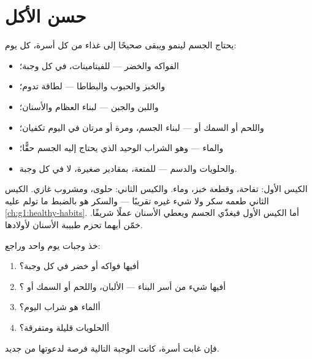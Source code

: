 \section{حسن الأكل}

\begin{proposition}\label{prop:g2:teeth-and-eating-well:balanced}
يحتاج الجسم لينمو ويبقى صحيحًا إلى غذاء من كل أسرة، كل يوم:
\begin{itemize}
  \item الفواكه والخضر --- للفيتامينات، في كل وجبة؛
  \item والخبز والحبوب والبطاطا --- لطاقة تدوم؛
  \item {} واللبن والجبن --- لبناء العظام والأسنان؛
  \item واللحم أو السمك أو  --- لبناء الجسم، ومرة أو مرتان في
        اليوم تكفيان؛
  \item والماء --- وهو الشراب الوحيد الذي يحتاج إليه الجسم حقًّا؛
  \item والحلويات والدسم --- للمتعة، بمقادير صغيرة، لا في كل وجبة.
\end{itemize}
\end{proposition}
\admitted

\begin{example}\label{ex:g2:teeth-and-eating-well:snack}
الكيس الأول: تفاحة، وقطعة خبز، وماء. والكيس الثاني: حلوى، ومشروب
غازي. الكيس الثاني طعمه سكر ولا شيء غيره تقريبًا --- والسكر هو
بالضبط ما تولم عليه  \cref{ch:g1:healthy-habits}. أما الكيس
الأول فيغذّي الجسم ويعطي الأسنان عملًا شريفًا. خمّن أيهما تحزم
طبيبة الأسنان لأولادها.
\end{example}

\begin{method}\label{met:g2:teeth-and-eating-well:check}
خذ وجبات يوم واحد وراجع:
\begin{enumerate}
  \item أفيها فواكه أو خضر في كل وجبة؟
  \item أفيها شيء من أسر البناء --- الألبان، واللحم أو السمك أو
        ؟
  \item أالماء هو شراب اليوم؟
  \item أالحلويات قليلة ومتفرقة؟
\end{enumerate}
فإن غابت أسرة، كانت الوجبة التالية فرصة لدعوتها من جديد.
\end{method}

